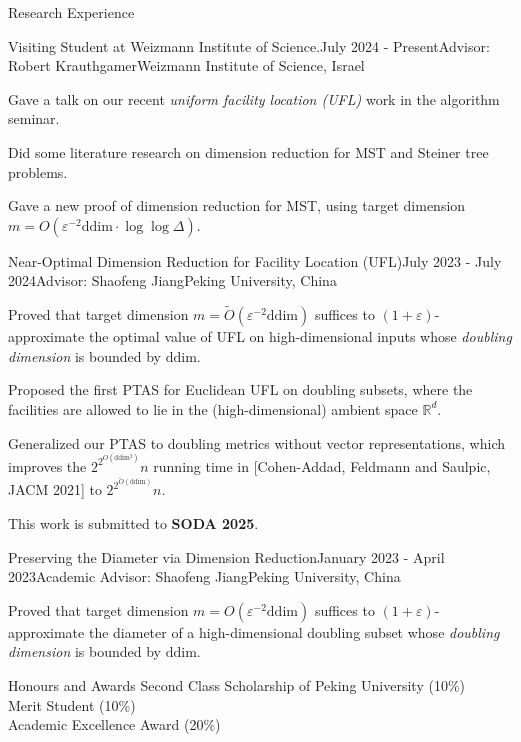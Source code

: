 \documentclass{resume} %
\begin{document}
\begin{rSection}{Research Experience}{}
    \begin{rSubsection}{Visiting Student at Weizmann Institute of Science.}{July 2024 - Present}{Advisor: Robert Krauthgamer}{Weizmann Institute of Science, Israel}
        \item Gave a talk on our recent \emph{uniform facility location (UFL)} work in the algorithm seminar.
        \item Did some literature research on dimension reduction for MST and Steiner tree problems.
        \item Gave a new proof of dimension reduction for MST, using target dimension $m = O(\varepsilon^{-2} \mathrm{ddim} \cdot \log\log \Delta)$.
    \end{rSubsection}

    \begin{rSubsection}{Near-Optimal Dimension Reduction for Facility Location (UFL)}{July 2023 - July 2024}{Advisor: Shaofeng Jiang}{Peking University, China}
       \item Proved that target dimension $m = \tilde{O}(\varepsilon^{-2} \mathrm{ddim})$ suffices to $(1+\varepsilon)$-approximate the optimal value of UFL on high-dimensional inputs whose \emph{doubling dimension} is bounded by $\mathrm{ddim}$.
       \item Proposed the first PTAS for Euclidean UFL on doubling subsets, where the facilities are allowed to lie in the (high-dimensional) ambient space $\mathbb{R}^d$.
       \item Generalized our PTAS to doubling metrics without vector representations, which improves the $2^{2^{O(\mathrm{ddim^2})}} n$ running time in [Cohen-Addad, Feldmann and Saulpic, JACM 2021] to $2^{2^{\tilde O(\mathrm{ddim})}} n$.
       \item This work is submitted to {\bf SODA 2025}.
    \end{rSubsection}

    \begin{rSubsection}{Preserving the Diameter via Dimension Reduction}{January 2023 - April 2023}{Academic Advisor: Shaofeng Jiang}{Peking University, China}
        \item Proved that target dimension $m = O(\varepsilon^{-2} \mathrm{ddim})$ suffices to $(1+\varepsilon)$-approximate the diameter of a high-dimensional doubling subset whose \emph{doubling dimension} is bounded by $\mathrm{ddim}$.
    \end{rSubsection}
\end{rSection}

\begin{rSection}{Honours and Awards}{}
    Second Class Scholarship of Peking University (10\%) 
    \\ Merit Student (10\%) 
    \\ Academic Excellence Award (20\%) 
\end{rSection}
\end{document}
